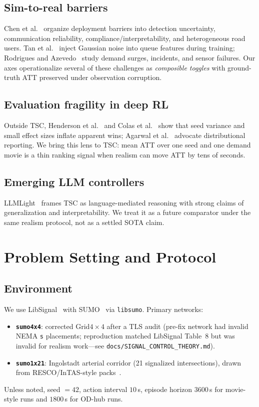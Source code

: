 \documentclass[11pt,a4paper]{article}
\begin{document}
\subsection{Sim-to-real barriers}
Chen et al.~\citep{chen2022realdeal} organize deployment barriers into detection uncertainty, communication reliability, compliance/interpretability, and heterogeneous road users.
Tan et al.~\citep{tan2020robust} inject Gaussian noise into queue features during training; Rodrigues and Azevedo~\citep{rodrigues2019towards} study demand surges, incidents, and sensor failures.
Our axes operationalize several of these challenges as \emph{composible toggles} with ground-truth ATT preserved under observation corruption.

\subsection{Evaluation fragility in deep RL}
Outside TSC, Henderson et al.~\citep{henderson2018matters} and Colas et al.~\citep{colas2018seeds} show that seed variance and small effect sizes inflate apparent wins; Agarwal et al.~\citep{agarwal2021rliable} advocate distributional reporting.
We bring this lens to TSC: mean ATT over one seed and one demand movie is a thin ranking signal when realism can move ATT by tens of seconds.

\subsection{Emerging LLM controllers}
LLMLight~\citep{lai2024llmlight} frames TSC as language-mediated reasoning with strong claims of generalization and interpretability.
We treat it as a future comparator under the same realism protocol, not as a settled SOTA claim.

\section{Problem Setting and Protocol}
\label{sec:protocol}

\subsection{Environment}
We use LibSignal~\citep{mei2023libsignal} with SUMO~\citep{lopez2018sumo} via \texttt{libsumo}.
Primary networks:
\begin{itemize}
  \item \textbf{\texttt{sumo4x4}}: corrected Grid$4{\times}4$ after a TLS audit (pre-fix network had invalid NEMA \texttt{s} placements; reproduction matched LibSignal Table~8 but was invalid for realism work---see \texttt{docs/SIGNAL\_CONTROL\_THEORY.md}).
  \item \textbf{\texttt{sumo1x21}}: Ingolstadt arterial corridor (21 signalized intersections), drawn from RESCO/InTAS-style packs~\citep{ault2021resco}.
\end{itemize}
Unless noted, seed $=42$, action interval $10$\,s, episode horizon $3600$\,s for movie-style runs and $1800$\,s for OD-hub runs.
\end{document}
